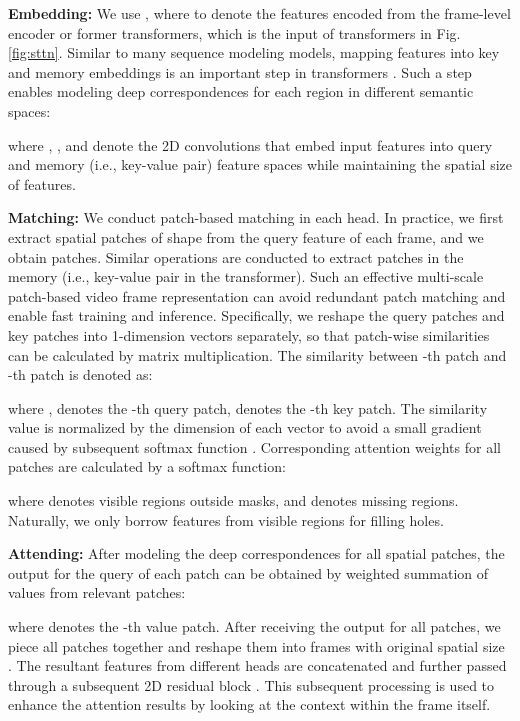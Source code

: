 \documentclass[runningheads]{llncs}
\begin{document}
\textbf{Embedding:} 
We use , where  to denote the features encoded from the frame-level encoder or former transformers, which is the input of transformers in Fig. \ref{fig:sttn}. 
Similar to many sequence modeling models, mapping features into key and memory embeddings is an important step in transformers \cite{girdhar2019video,vaswani2017attention}. Such a step enables modeling deep correspondences for each region in different semantic spaces:

where , ,  and  denote the  2D convolutions that embed input features into query and memory (i.e., key-value pair) feature spaces while maintaining the spatial size of features. 


\textbf{Matching:} 
We conduct patch-based matching in each head. In practice, we first extract spatial patches of shape  from the query feature of each frame, and we obtain  patches. Similar operations are conducted to extract patches in the memory (i.e., key-value pair in the transformer). 
Such an effective multi-scale patch-based video frame representation can avoid redundant patch matching and enable fast training and inference.
Specifically, we reshape the query patches and key patches into 1-dimension vectors separately, so that patch-wise similarities can be calculated by matrix multiplication. The similarity between -th patch and -th patch is denoted as:

where ,  denotes the -th query patch,  denotes the -th key patch. The similarity value is normalized by the dimension of each vector to avoid a small gradient caused by subsequent softmax function \cite{vaswani2017attention}. 
Corresponding attention weights for all patches are calculated by a softmax function:
 
where  denotes visible regions outside masks, and  denotes missing regions. Naturally, we only borrow features from visible regions for filling holes. 


\textbf{Attending:} 
After modeling the deep correspondences for all spatial patches, the output for the query of each patch can be obtained by weighted summation of values from relevant patches:
 
where  denotes the -th value patch. After receiving the output for all patches, we piece all patches together and reshape them into  frames with original spatial size . The resultant features from different heads are concatenated and further passed through a subsequent 2D residual block \cite{he2016deep}. This subsequent processing is used to enhance the attention results by looking at the context within the frame itself.
\end{document}
